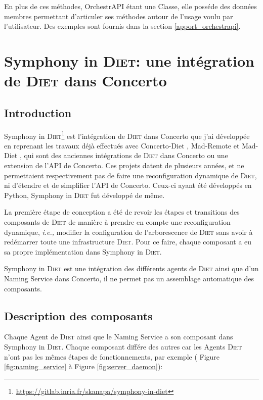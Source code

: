 \documentclass{article}
\newcommand{\ie}{\emph{i.e.,} }
\newcommand{\cf}{\emph{\text{cf }}\xspace}
\newcommand{\api}{API\xspace}
\newcommand{\diet}{\textsc{Diet}\xspace} %
\newcommand{\ns}{Naming Service\xspace}
\newcommand{\concerto}{Concerto\xspace}
\newcommand{\symphonyind}{Symphony in \diet} %
\newcommand{\orchestrapi}{OrchestrAPI\xspace}
\begin{document}
En plus de ces méthodes, \orchestrapi étant une Classe, elle posséde des données
membres permettant d'articuler ses méthodes autour de l'usage voulu par
l'utilisateur. Des exemples sont fournis dans la section
\ref{apport_orchestrapi}.



\section{\symphonyind : une intégration de \diet dans \concerto}\label{section:symphonyind}
\subsection{Introduction}
\symphonyind\footnote{
\url{https://gitlab.inria.fr/skanapa/symphony-in-diet}} est l'intégration de
\diet dans \concerto que j'ai développée en reprenant les travaux déjà effectués
avec \og Concerto-Diet \fg, \og Mad-Remote \fg et \og Mad-Diet \fg , qui sont
des anciennes intégrations de \diet dans \concerto ou une extension de l'\api de
\concerto. Ces projets datent de plusieurs années, et ne permettaient
respectivement pas de faire une reconfiguration dynamique de \diet, ni d'étendre
et de simplifier l'\api de \concerto. Ceux-ci ayant été développés en Python,
\symphonyind fut développé de même.


La première étape de conception a été de revoir les étapes et transitions des
composants de \diet de manière à prendre en compte une reconfiguration
dynamique, \ie modifier la configuration de l'arborescence de \diet sans avoir à
redémarrer toute une infrastructure \diet. Pour ce faire, chaque composant a eu
sa propre implémentation dans \symphonyind.

\symphonyind est une intégration des différents agents de \diet ainsi que d'un
\ns dans \concerto, il ne permet pas un assemblage automatique des composants.


\subsection{Description des composants}
Chaque Agent de \diet ainsi que le Naming Service a son composant dans
\symphonyind. Chaque composant différe  des autres car les Agents \diet n'ont
pas les mêmes étapes de fonctionnements, par exemple (\cf Figure
\ref{fig:naming_service} à Figure \ref{fig:server_daemon}): \newline\newline
\end{document}
